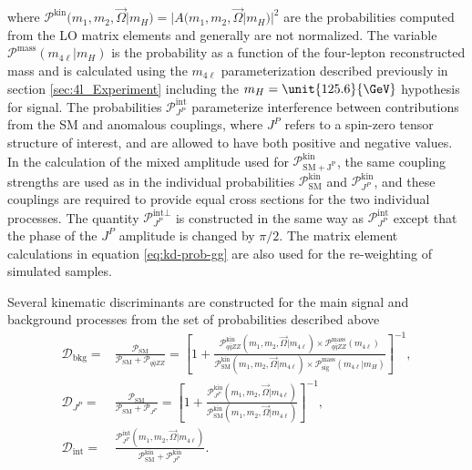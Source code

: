 where $\mathcal{P}^\text{kin}(m_1, m_2, \vec\Omega|m_{H}) = |{A}(m_1, m_2, \vec\Omega|m_{H})|^2$
are the probabilities computed from the LO matrix elements and generally are not normalized.
The variable \\$\mathcal{P}^\text{mass}(m_{4\ell}|m_{H})$ is the probability as a function of the four-lepton reconstructed mass
and is calculated using the $m_{4\ell}$ parameterization described previously in section \ref{sec:4l_Experiment}
including the $m_{H}=\unit{125.6}{\GeV}$ hypothesis for signal.
The probabilities $\mathcal{P}_{J^P} ^\text{int}$ parameterize interference between contributions from the SM and
anomalous couplings, where $J^P$ refers to a spin-zero tensor structure of interest, and are allowed to have both positive
and negative values. In the calculation of the mixed amplitude used for $\mathcal{P}^\text{kin}_\mathrm{SM + J^P}$,
the same coupling strengths are used as in the individual probabilities $\mathcal{P}^\text{kin}_\mathrm{SM}$ and $\mathcal{P}^\text{kin}_{J^P}$,
and these couplings are required to provide equal cross sections for the two individual processes.
The quantity $\mathcal{P}_{J^P} ^{\text{int}\perp}$ is constructed in the same way
as $\mathcal{P}_{J^P} ^\text{int}$ except that the phase of the $J^P$ amplitude is changed by $\pi/2$.
The matrix element calculations in equation \eqref{eq:kd-prob-gg} are also used for the re-weighting of simulated samples.

Several kinematic discriminants are constructed for the main signal and background processes
from the set of probabilities described above
\begin{equation}\begin{aligned}
 \mathcal{D}_\text{bkg} =& \frac{\mathcal{P}_\mathrm{SM} }{\mathcal{P}_\mathrm{SM} +\mathcal{P}_{q\bar{q}ZZ} }=
\left[1+\frac{\mathcal{P}^\text{kin}_{q\bar{q}ZZ} (m_1, m_2, \vec\Omega | m_{4\ell})\times \mathcal{P}^\text{mass}_{q\bar{q}ZZ} (m_{4\ell})  }
{\mathcal{P}^\text{kin}_\mathrm{SM} (m_1, m_2, \vec\Omega | m_{4\ell}) \times \mathcal{P}^\text{mass}_\text{sig} (m_{4\ell}|m_{H}) } \right]^{-1} ,
 \\
\mathcal{D}_{J^P} =& \frac{\mathcal{P}_\mathrm{SM} }{\mathcal{P}_\mathrm{SM} + \mathcal{P}_{J^P} }=
\left[1+ \frac{\mathcal{P}^\text{kin}_{J^P} (m_1, m_2, \vec\Omega | m_{4\ell}) }
{\mathcal{P}^\text{kin}_\mathrm{SM} (m_1, m_2, \vec\Omega | m_{4\ell}) } \right]^{-1} ,
 \\
\mathcal{D}_\text{int} =& \frac{ \mathcal{P}_{J^P}^\text{int}(m_1, m_2, \vec\Omega | m_{4\ell})}
{\mathcal{P}^\text{kin}_\mathrm{SM} +\mathcal{P}^\text{kin}_{J^P} }  .
\end{aligned}\end{equation}

